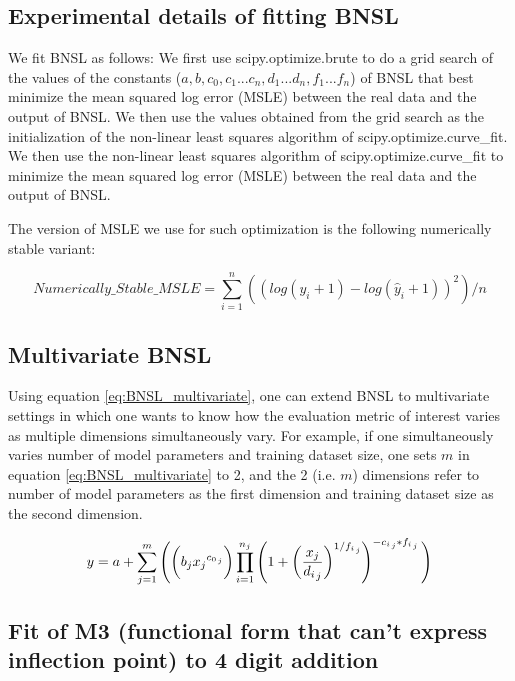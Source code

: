\documentclass{article} %
\begin{document}
\subsection{Experimental details of fitting BNSL}
\label{section:BNSL_fit_details}
We fit BNSL as follows:
We first use scipy.optimize.brute to do a grid search of the values of the constants ($a, b, c_0, c_1 ... c_n, d_1 ...  d_n, f_1 ... f_n$) of BNSL that best minimize the mean squared log error (MSLE) between the real data and the output of BNSL.
We then use the values obtained from the grid search as the initialization of the non-linear least squares algorithm of scipy.optimize.curve\_fit.
We then use the non-linear least squares algorithm of scipy.optimize.curve\_fit to minimize the mean squared log error (MSLE) between the real data and the output of BNSL.

The version of MSLE we use for such optimization is the following numerically stable variant:

\[Numerically\_Stable\_MSLE = \sum_{i=1}^{n} ((log(y_{i}+1)-log(\hat{y}_{i}+1))^2)/n\] 

\subsection{Multivariate BNSL}
\label{section:BNSL_multivariate}

Using equation \ref{eq:BNSL_multivariate}, one can extend BNSL to multivariate settings in which one wants to know how the evaluation metric of interest varies as multiple dimensions simultaneously vary. For example, if one simultaneously varies number of model parameters and training dataset size, one sets $m$ in equation \ref{eq:BNSL_multivariate} to 2, and the 2 (i.e. $m$) dimensions refer to number of model parameters as the first dimension and training dataset size as the second dimension.

\begin{equation}
\vspace{-0.05in}
y =  a + \sum_{j=1}^{m}\Bigg(\bigg(b_j{x_j}^{{{c_0}_{}}_j}\bigg) \prod_{i=1}^{n_j} \left(1 + \left(\frac{x_j}{{{d_i}_{}}_j}\right)^{{1/{{f_i}_{}}}_j}\right)^{-{{c_i}_{}}_j * {{f_i}_{}}_j}\Bigg)
\label{eq:BNSL_multivariate}
\end{equation}


\iffalse

\subsection{Fit of M3 (functional form that can't express inflection point) to 4 digit addition}
\FloatBarrier
\label{section:M3_addition_failure}
\end{document}
